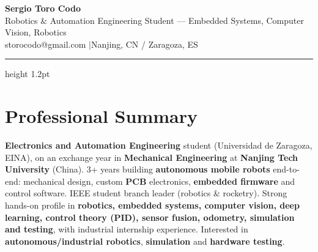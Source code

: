 \documentclass[10pt,a4paper]{article}
\begin{document}
\pagestyle{empty}

\begin{center}
  {\LARGE\bfseries\color{cvblue} Sergio Toro Codo}\\[2pt]
  {\small Robotics \& Automation Engineering Student --- Embedded Systems, Computer Vision, Robotics}\\[3pt]
  {\footnotesize
    storocodo@gmail.com \quad$\vert$\quad Nanjing, CN / Zaragoza, ES
  }
\end{center}
\vspace{1pt}
{\color{cvblue}\hrule height 1.2pt}
\vspace{4pt}

\section*{Professional Summary}
\textbf{Electronics and Automation Engineering} student (Universidad de Zaragoza, EINA), on an exchange year in \textbf{Mechanical Engineering} at \textbf{Nanjing Tech University} (China). 3+ years building \textbf{autonomous mobile robots} end-to-end: mechanical design, custom \textbf{PCB} electronics, \textbf{embedded firmware} and control software. IEEE student branch leader (robotics \& rocketry). Strong hands-on profile in \textbf{robotics, embedded systems, computer vision, deep learning, control theory (PID), sensor fusion, odometry, simulation and testing}, with industrial internship experience. Interested in \textbf{autonomous/industrial robotics}, \textbf{simulation} and \textbf{hardware testing}.

\end{document}
